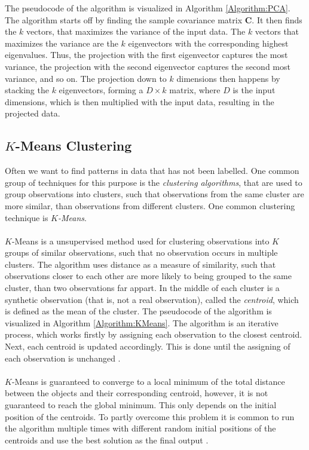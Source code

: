 \documentclass[./main.tex]{subfiles}
\begin{document}
The pseudocode of the algorithm is visualized in Algorithm \ref{Algorithm:PCA}. The algorithm starts off by finding the sample covariance matrix $\bm{C}$. It then finds the $k$ vectors, that maximizes the variance of the input data. The $k$ vectors that maximizes the variance are the $k$ eigenvectors with the corresponding highest eigenvalues. Thus, the projection with the first eigenvector captures the most variance, the projection with the second eigenvector captures the second most variance, and so on. The projection down to $k$ dimensions then happens by stacking the $k$ eigenvectors, forming a $D \times k$ matrix, where $D$ is the input dimensions, which is then multiplied with the input data, resulting in the projected data. \cite{MAD_book}

\subsection{$K$-Means Clustering}\label{subsec:K_means}
Often we want to find patterns in data that has not been labelled. One common group of techniques for this purpose is the \textit{clustering algorithms}, that are used to group observations into clusters, such that observations from the same cluster are more similar, than observations from different clusters. One common clustering technique is $K$\textit{-Means}.
\\
\\
$K$-Means is a unsupervised method used for clustering observations into $K$ groups of similar observations, such that no observation occurs in multiple clusters. The algorithm uses distance as a measure of similarity, such that observations closer to each other are more likely to being grouped to the same cluster, than two observations far appart. In the middle of each cluster is a synthetic observation (that is, not a real observation), called the \textit{centroid}, which is defined as the mean of the cluster. The pseudocode of the algorithm is visualized in Algorithm \ref{Algorithm:KMeans}. The algorithm is an iterative process, which works firstly by assigning each observation to the closest centroid. Next, each centroid is updated accordingly. This is done until the assigning of each observation is unchanged \cite{MAD_book}.
\\
\\
$K$-Means is guaranteed to converge to a local minimum of the total distance between the objects and their corresponding centroid, however, it is not guaranteed to reach the global minimum. This only depends on the initial position of the centroids. To partly overcome this problem it is common to run the algorithm multiple times with different random initial positions of the centroids and use the best solution as the final output \cite{MAD_book}.
\end{document}
